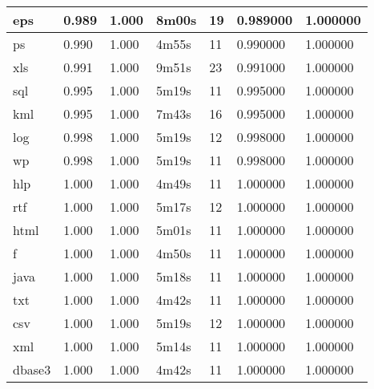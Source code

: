 \begin{table}[!ht]
\begin{tabular}{|l|l|l|l|l|l|l|}
eps      & 0.989           & 1.000          & 8m00s  & 19     & 0.989000  & 1.000000         \\ \hline
ps       & 0.990           & 1.000          & 4m55s  & 11     & 0.990000  & 1.000000         \\ \hline
xls      & 0.991           & 1.000          & 9m51s  & 23     & 0.991000  & 1.000000         \\ \hline
sql      & 0.995           & 1.000          & 5m19s  & 11     & 0.995000  & 1.000000         \\ \hline
kml      & 0.995           & 1.000          & 7m43s  & 16     & 0.995000  & 1.000000         \\ \hline
log      & 0.998           & 1.000          & 5m19s  & 12     & 0.998000  & 1.000000         \\ \hline
wp       & 0.998           & 1.000          & 5m19s  & 11     & 0.998000  & 1.000000         \\ \hline
hlp      & 1.000           & 1.000          & 4m49s  & 11     & 1.000000  & 1.000000         \\ \hline
rtf      & 1.000           & 1.000          & 5m17s  & 12     & 1.000000  & 1.000000         \\ \hline
html     & 1.000           & 1.000          & 5m01s  & 11     & 1.000000  & 1.000000         \\ \hline
f        & 1.000           & 1.000          & 4m50s  & 11     & 1.000000  & 1.000000         \\ \hline
java     & 1.000           & 1.000          & 5m18s  & 11     & 1.000000  & 1.000000         \\ \hline
txt      & 1.000           & 1.000          & 4m42s  & 11     & 1.000000  & 1.000000         \\ \hline
csv      & 1.000           & 1.000          & 5m19s  & 12     & 1.000000  & 1.000000         \\ \hline
xml      & 1.000           & 1.000          & 5m14s  & 11     & 1.000000  & 1.000000         \\ \hline
dbase3   & 1.000           & 1.000          & 4m42s  & 11     & 1.000000  & 1.000000         \\ \hline
\end{tabular}
\end{table}
